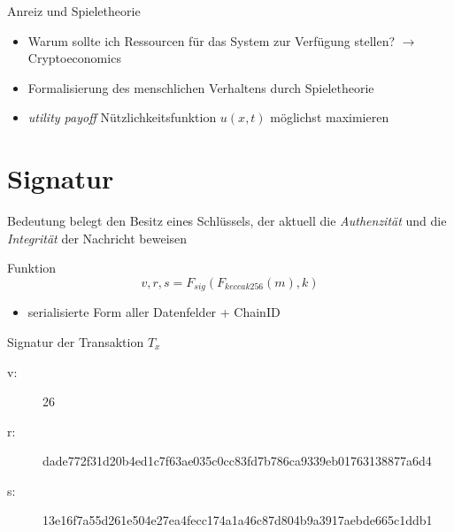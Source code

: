 \documentclass{f4_beamer}
\begin{document}
\begin{frame}{Anreiz und Spieletheorie}
  \begin{itemize}
  \item Warum sollte ich Ressourcen für das System zur Verfügung stellen? $ \rightarrow $Cryptoeconomics
  \item Formalisierung des menschlichen Verhaltens durch Spieletheorie
  \item  \textit{utility payoff} Nützlichkeitsfunktion $ u(x, t) $ möglichst maximieren
\end{itemize}
\end{frame}

\section{Signatur}
\begin{frame}{Bedeutung}
  belegt den Besitz eines Schlüssels, der aktuell die \textit{Authenzität} und die \textit{Integrität} der Nachricht beweisen
\end{frame}

\begin{frame}{Funktion}
  $$
  v, r, s = F_{sig}(F_{keccak256}(m), k)
  $$
  \begin{itemize}
  \item serialisierte Form aller Datenfelder + ChainID
\end{itemize}
\end{frame}

\begin{frame}{Signatur der Transaktion $T_x$}
  \begin{description}
    \item[v:] 26
    \item [r:] dade772f31d20b4ed1c7f63ae035c0cc83fd7b786ca9339eb01763138877a6d4
    \item[s:] 13e16f7a55d261e504e27ea4fecc174a1a46c87d804b9a3917aebde665c1ddb1
  \end{description}
\end{frame}
\end{document}
